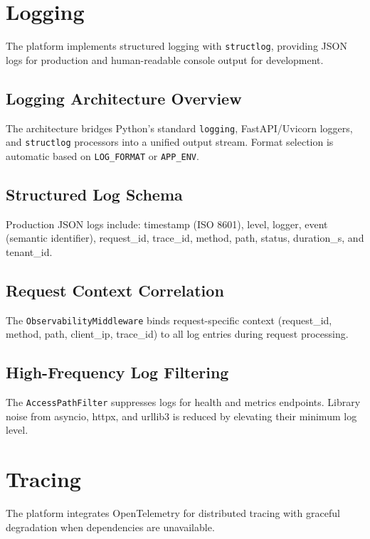 \documentclass[a4paper,twoside]{sapthesis}
\begin{document}
\section{Logging}
\label{sec:logging}

The platform implements structured logging with \texttt{structlog}, providing JSON logs for production and human-readable console output for development.

\subsection{Logging Architecture Overview}

The architecture bridges Python's standard \texttt{logging}, FastAPI/Uvicorn loggers, and \texttt{structlog} processors into a unified output stream. Format selection is automatic based on \texttt{LOG\_FORMAT} or \texttt{APP\_ENV}.

\subsection{Structured Log Schema}

Production JSON logs include: timestamp (ISO 8601), level, logger, event (semantic identifier), request\_id, trace\_id, method, path, status, duration\_s, and tenant\_id.

\subsection{Request Context Correlation}

The \texttt{ObservabilityMiddleware} binds request-specific context (request\_id, method, path, client\_ip, trace\_id) to all log entries during request processing.

\subsection{High-Frequency Log Filtering}

The \texttt{AccessPathFilter} suppresses logs for health and metrics endpoints. Library noise from asyncio, httpx, and urllib3 is reduced by elevating their minimum log level.

\section{Tracing}
\label{sec:tracing}

The platform integrates OpenTelemetry for distributed tracing with graceful degradation when dependencies are unavailable.
\end{document}
